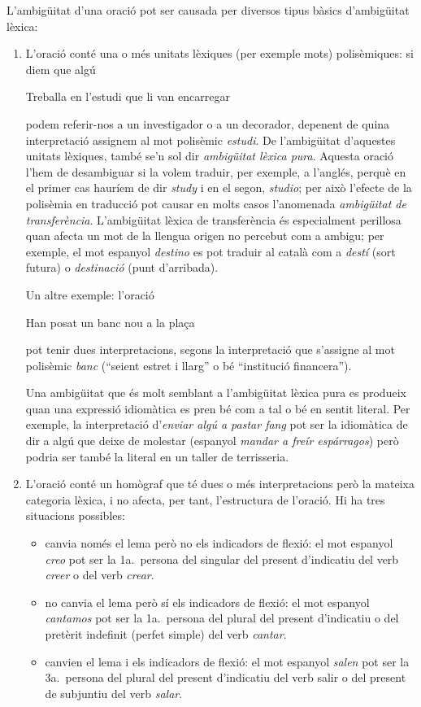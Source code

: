 L'ambigüitat d'una oració pot ser causada per diversos tipus bàsics
d'ambigüitat lèxica:
\begin{enumerate}
\item L'oració conté una o més unitats lèxiques (per exemple mots)
  polisèmiques: si diem que algú
\begin{exemple}
  Treballa en l'estudi que li van encarregar
\end{exemple} 
podem referir-nos a un investigador o a un decorador, depenent de
quina interpretació assignem al mot polisèmic \emph{estudi}. De
l'ambigüitat d'aquestes unitats lèxiques, també se'n sol dir {\em
  ambigüitat lèxica pura}.  Aquesta oració l'hem de desambiguar si la
volem traduir, per exemple, a l'anglés, perquè en el primer cas
hauríem de dir \emph{study} i en el segon, \emph{studio}; per això
l'efecte de la polisèmia en traducció pot causar en molts casos
l'anomenada {\em ambigüitat de transferència}.  L'ambigüitat lèxica de
transferència és especialment perillosa quan afecta un mot de la
llengua origen no percebut com a ambigu; per exemple, el mot espanyol
\emph{destino} es pot traduir al català com a {\em destí} (sort
futura) o \emph{destinació} (punt d'arribada).
  
Un altre exemple: l'oració
\begin{exemple}
  Han posat un banc nou a la plaça
\end{exemple}
pot tenir dues interpretacions, segons la interpretació que s'assigne
al mot polisèmic \emph{banc} (``seient estret i llarg'' o bé
``institució financera'').
  
Una ambigüitat que és molt semblant a l'ambigüitat lèxica pura es
produeix quan una expressió idiomàtica es pren bé com a tal o bé en
sentit literal. Per exemple, la interpretació d'\emph{enviar algú a
  pastar fang} pot ser la idiomàtica de dir a algú que deixe de
molestar (espanyol \emph{mandar a freír espárragos}) però podria ser
també la literal en un taller de terrisseria.
  
\item L'oració conté un homògraf que té dues o més interpretacions
  però la mateixa categoria lèxica, i no afecta, per tant,
  l'estructura de l'oració. 
 Hi ha tres situacions possibles:
   \begin{itemize}
   \item canvia només el lema però no els indicadors de flexió: el
     mot espanyol \emph{creo} pot ser la 1a.\ persona del singular del
     present d'indicatiu del verb \emph{creer} o del verb \emph{crear}.
   \item no canvia el lema però sí els indicadors de flexió: el mot
     espanyol \emph{cantamos} pot ser la 1a.\ persona del plural del
     present d'indicatiu o del pretèrit indefinit (perfet simple) del
     verb \emph{cantar}.
   \item canvien el lema i els indicadors de flexió: el mot espanyol
     \emph{salen} pot ser la 3a.\ persona del plural del present
     d'indicatiu del verb salir o del present de subjuntiu del verb
     \emph{salar}.
   \end{itemize}
  

\end{enumerate}
